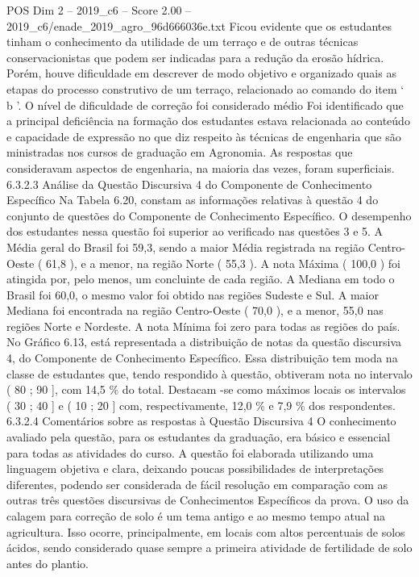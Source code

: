\begin{textsample}{POS Dim 2 – 2019\_c6 – Score 2.00 – 2019\_c6/enade\_2019\_agro\_96d666036e.txt}
Ficou evidente que os estudantes tinham o conhecimento da utilidade de um terraço e de outras técnicas conservacionistas que podem ser indicadas para a redução da erosão hídrica.
Porém, houve dificuldade em descrever de modo objetivo e organizado quais as etapas do processo construtivo de um terraço, relacionado ao comando do item ‘ b ’.
O nível de dificuldade de correção foi considerado médio Foi identificado que a principal deficiência na formação dos estudantes estava relacionada ao conteúdo e capacidade de expressão no que diz respeito às técnicas de engenharia que são ministradas nos cursos de graduação em Agronomia.
As respostas que consideravam aspectos de engenharia, na maioria das vezes, foram superficiais. 6.3.2.3 Análise da Questão Discursiva 4 do Componente de Conhecimento Específico Na Tabela 6.20, constam as informações relativas à questão 4 do conjunto de questões do Componente de Conhecimento Específico.
O desempenho dos estudantes nessa questão foi superior ao verificado nas questões 3 e 5.
A Média geral do Brasil foi 59,3, sendo a maior Média registrada na região Centro-Oeste ( 61,8 ), e a menor, na região Norte ( 55,3 ).
A nota Máxima ( 100,0 ) foi atingida por, pelo menos, um concluinte de cada região.
A Mediana em todo o Brasil foi 60,0, o mesmo valor foi obtido nas regiões Sudeste e Sul.
A maior Mediana foi encontrada na região Centro-Oeste ( 70,0 ), e a menor, 55,0 nas regiões Norte e Nordeste.
A nota Mínima foi zero para todas as regiões do país.
No Gráfico 6.13, está representada a distribuição de notas da questão discursiva 4, do Componente de Conhecimento Específico.
Essa distribuição tem moda na classe de estudantes que, tendo respondido à questão, obtiveram nota no intervalo ( 80 ; 90 ], com 14,5 \% do total.
Destacam -se como máximos locais os intervalos ( 30 ; 40 ] e ( 10 ; 20 ] com, respectivamente, 12,0 \% e 7,9 \% dos respondentes. 6.3.2.4 Comentários sobre as respostas à Questão Discursiva 4 O conhecimento avaliado pela questão, para os estudantes da graduação, era básico e essencial para todas as atividades do curso.
A questão foi elaborada utilizando uma linguagem objetiva e clara, deixando poucas possibilidades de interpretações diferentes, podendo ser considerada de fácil resolução em comparação com as outras três questões discursivas de Conhecimentos Específicos da prova.
O uso da calagem para correção de solo é um tema antigo e ao mesmo tempo atual na agricultura.
Isso ocorre, principalmente, em locais com altos percentuais de solos ácidos, sendo considerado quase sempre a primeira atividade de fertilidade de solo antes do plantio.

\end{textsample}
